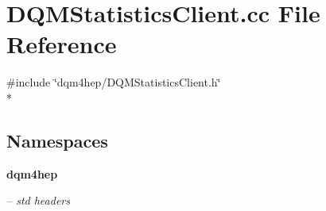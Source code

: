 \section{D\+Q\+M\+Statistics\+Client.\+cc File Reference}
\label{DQMStatisticsClient_8cc}
{\ttfamily \#include \char`\"{}dqm4hep/\+D\+Q\+M\+Statistics\+Client.\+h\char`\"{}}\\*
\subsection*{Namespaces}
\begin{DoxyCompactItemize}
\item 
 {\bf dqm4hep}
\begin{DoxyCompactList}\small\item\em -- std headers \end{DoxyCompactList}\end{DoxyCompactItemize}
